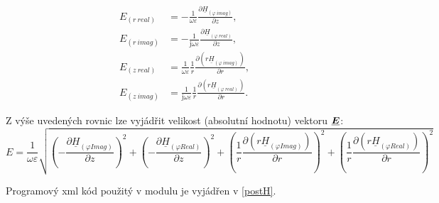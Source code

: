 \documentclass[12pt,a4paper,oneside]{article}
\numberwithin{equation}{section} %
\numberwithin{figure}{section} %
\numberwithin{table}{section} %
\newcommand{\mj}{\mathrm{j}} %
\renewcommand{\vec}[1]{\mbox{\boldmath$#1$}} %
\newcommand{\faz}[1]{{\underline{#1}}} %
\begin{document}
\begin{subequations}
\begin{align}
E _{(r~real)} &= - \frac{1}{\omega \varepsilon} \frac{\partial \faz{H} _{(\varphi ~ imag)}}{\partial z} ,
\\
E _{(r~imag)} &= - \frac{1}{\mj \omega \varepsilon} \frac{\partial \faz{H} _{(\varphi ~ real)}}{\partial z} ,
\\
E _{(z~real)} &= \frac{1}{\omega \varepsilon} \frac{1}{r} \frac{\partial (r \faz{H} _{(\varphi ~ imag)})}{\partial r} ,
\\
E _{(z~imag)} &= \frac{1}{\mj \omega \varepsilon} \frac{1}{r} \frac{\partial (r \faz{H} _{(\varphi ~ real)})}{\partial r} .
\end{align}
\end{subequations}

Z výše uvedených rovnic lze vyjádřit velikost (absolutní hodnotu) vektoru $\faz{\vec{E}}$:
\begin{equation}
E = \frac{1}{\omega \varepsilon} \sqrt{\left( - \frac{\partial \faz{H} _{(\varphi Imag)}}{\partial z} \right) ^2 + \left( - \frac{\partial \faz{H} _{(\varphi Real)}}{\partial z} \right) ^2 + \left( \frac{1}{r} \frac{\partial (r \faz{H} _{(\varphi Imag)})}{\partial r} \right) ^2 + \left( \frac{1}{r} \frac{\partial (r \faz{H} _{(\varphi Real)})}{\partial r} \right) ^2}
\end{equation}

Programový xml kód použitý v modulu je vyjádřen v \ref{postH}.
\end{document}
